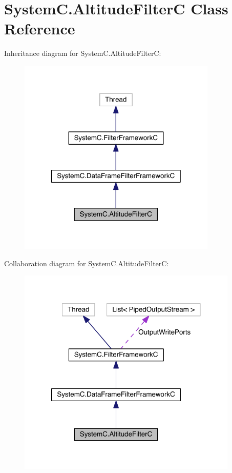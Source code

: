\hypertarget{class_system_c_1_1_altitude_filter_c}{}\section{System\+C.\+Altitude\+Filter\+C Class Reference}
\label{class_system_c_1_1_altitude_filter_c}


Inheritance diagram for System\+C.\+Altitude\+Filter\+C\+:\nopagebreak
\begin{figure}[H]
\begin{center}
\leavevmode
\includegraphics[width=268pt]{class_system_c_1_1_altitude_filter_c__inherit__graph}
\end{center}
\end{figure}


Collaboration diagram for System\+C.\+Altitude\+Filter\+C\+:\nopagebreak
\begin{figure}[H]
\begin{center}
\leavevmode
\includegraphics[width=297pt]{class_system_c_1_1_altitude_filter_c__coll__graph}
\end{center}
\end{figure}
